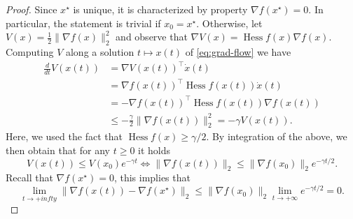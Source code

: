  
     \begin{proof}
         Since $x^\star$ is unique, it is characterized by property $\nabla f(x^\star)=0$. In particular, the statement is trivial if $x_0=x^\star$.
         Otherwise, let $V(x) = \frac12\|\nabla f(x)\|_2^2$ and observe that $\nabla V(x) = \operatorname{Hess}f(x) \nabla f(x)$. Computing $V$ along a solution $t\mapsto x(t)$ of \eqref{eq:grad-flow} we have
         \begin{equation}
             \begin{split}
                 \frac{d}{dt}V(x(t))
                  & = \nabla V(x(t))^\top \dot x(t)                                  \\
                  & = \nabla f(x(t))^\top \operatorname{Hess}f(x(t)) \dot x(t)       \\
                  & = -\nabla f(x(t))^\top \operatorname{Hess}f(x(t)) \nabla f(x(t)) \\
                  & \le -\frac{\gamma}2 \|\nabla f(x(t))\|_2^2 = -\gamma V(x(t)).
             \end{split}
         \end{equation}
         Here, we used the fact that $\operatorname{Hess}f(x)\ge \gamma/2$.
         By integration of the above, we then obtain that for any $t\ge 0$ it holds
         \begin{equation}
             V(x(t)) \le V(x_0)e^{-\gamma t}
             \iff
             \|\nabla f(x(t))\|_2\le \|\nabla f(x_0)\|_2 e^{-\gamma t/2}.
         \end{equation}
         Recall that $\nabla f(x^\star)=0$, this implies that
         \begin{equation}
             \label{eq:estimate-grad}
             \lim_{t\to +infty} \|\nabla f(x(t)) - \nabla f(x^\star)\|_2 \le \|\nabla f(x_0)\|_2 \lim_{t\to +\infty} e^{-\gamma t/2} = 0.
         \end{equation}
 

\end{proof}
